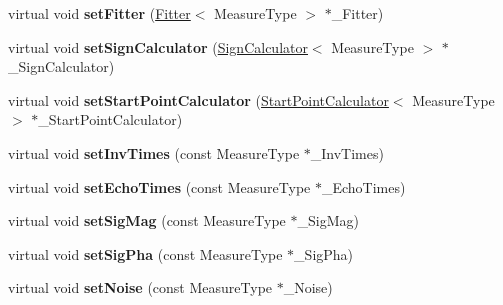 \begin{DoxyCompactItemize}
\item 
\hypertarget{class_ox_1_1_calculator_a65d901e63b2f59b77a7dea82eaaa8215}{virtual void {\bfseries set\-Fitter} (\hyperlink{class_ox_1_1_fitter}{Fitter}$<$ Measure\-Type $>$ $\ast$\-\_\-\-Fitter)}\label{class_ox_1_1_calculator_a65d901e63b2f59b77a7dea82eaaa8215}

\item 
\hypertarget{class_ox_1_1_calculator_a9b29545ec9a0e911217f496f7d539471}{virtual void {\bfseries set\-Sign\-Calculator} (\hyperlink{class_ox_1_1_sign_calculator}{Sign\-Calculator}$<$ Measure\-Type $>$ $\ast$\-\_\-\-Sign\-Calculator)}\label{class_ox_1_1_calculator_a9b29545ec9a0e911217f496f7d539471}

\item 
\hypertarget{class_ox_1_1_calculator_a1ea380bc76e9cd19f0a04254ae167230}{virtual void {\bfseries set\-Start\-Point\-Calculator} (\hyperlink{class_ox_1_1_start_point_calculator}{Start\-Point\-Calculator}$<$ Measure\-Type $>$ $\ast$\-\_\-\-Start\-Point\-Calculator)}\label{class_ox_1_1_calculator_a1ea380bc76e9cd19f0a04254ae167230}

\item 
\hypertarget{class_ox_1_1_calculator_a1dcb241d551a06436108a9f4bf916ece}{virtual void {\bfseries set\-Inv\-Times} (const Measure\-Type $\ast$\-\_\-\-Inv\-Times)}\label{class_ox_1_1_calculator_a1dcb241d551a06436108a9f4bf916ece}

\item 
\hypertarget{class_ox_1_1_calculator_aaf50e9d3fae8e95ff981bf15e17bba28}{virtual void {\bfseries set\-Echo\-Times} (const Measure\-Type $\ast$\-\_\-\-Echo\-Times)}\label{class_ox_1_1_calculator_aaf50e9d3fae8e95ff981bf15e17bba28}

\item 
\hypertarget{class_ox_1_1_calculator_a51fb95a1a68b1e14b659761c1f64aaab}{virtual void {\bfseries set\-Sig\-Mag} (const Measure\-Type $\ast$\-\_\-\-Sig\-Mag)}\label{class_ox_1_1_calculator_a51fb95a1a68b1e14b659761c1f64aaab}

\item 
\hypertarget{class_ox_1_1_calculator_a7b753dac0897ee4a5cb9c4d7a21d0926}{virtual void {\bfseries set\-Sig\-Pha} (const Measure\-Type $\ast$\-\_\-\-Sig\-Pha)}\label{class_ox_1_1_calculator_a7b753dac0897ee4a5cb9c4d7a21d0926}

\item 
\hypertarget{class_ox_1_1_calculator_ac78f71339011991131c3b142ae1a9f45}{virtual void {\bfseries set\-Noise} (const Measure\-Type $\ast$\-\_\-\-Noise)}\label{class_ox_1_1_calculator_ac78f71339011991131c3b142ae1a9f45}


\end{DoxyCompactItemize}
